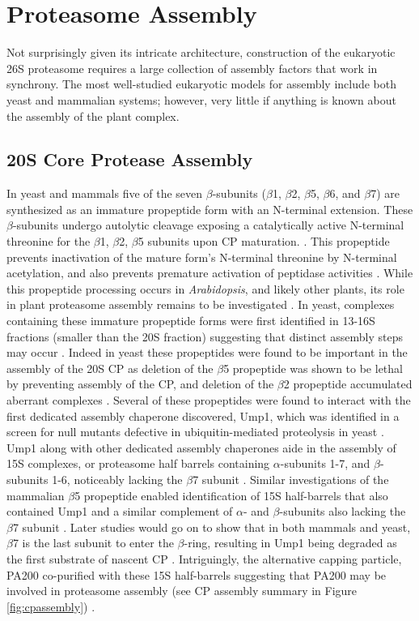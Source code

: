\section{Proteasome Assembly}
	Not surprisingly given its intricate architecture, construction of the eukaryotic 26S proteasome requires a large collection of assembly factors that work in synchrony. The most well-studied eukaryotic models for assembly include both yeast and mammalian systems; however, very little if anything is known about the assembly of the plant complex.

\subsection{20S Core Protease Assembly}
	 In yeast and mammals five of the seven $\beta$-subunits ($\beta$1, $\beta$2, $\beta$5, $\beta$6, and $\beta$7) are synthesized as an immature propeptide form with an N-terminal extension. These $\beta$-subunits undergo autolytic cleavage exposing a catalytically active N-terminal threonine for the $\beta$1, $\beta$2, $\beta$5 subunits upon CP maturation.  \citep{gu14, lee90}. This propeptide prevents inactivation of the mature form's N-terminal threonine by N-terminal acetylation, and also prevents premature activation of peptidase activities \citep{arendt99, arendt97}. While this propeptide processing occurs in \textit{Arabidopsis}, and likely other plants, its role in plant proteasome assembly remains to be investigated \citep{book10}. In yeast, complexes containing these immature propeptide forms were first identified in 13-16S fractions (smaller than the 20S fraction) suggesting that distinct assembly steps may occur \citep{frentzel94}. Indeed in yeast these propeptides were found to be important in the assembly of the 20S CP as deletion of the $\beta$5 propeptide was shown to be lethal by preventing assembly of the CP, and deletion of the $\beta$2 propeptide accumulated aberrant complexes \citep{jager99}. Several of these propeptides were found to interact with the first dedicated assembly chaperone discovered, Ump1, which was identified in a screen for null mutants defective in ubiquitin-mediated proteolysis in yeast \citep{li07, ramos98}. Ump1 along with other dedicated assembly chaperones aide in the assembly of 15S complexes, or proteasome half barrels containing $\alpha$-subunits 1-7, and $\beta$-subunits 1-6, noticeably lacking the $\beta$7 subunit \citep{li07, marques07}. Similar investigations of the mammalian $\beta$5 propeptide enabled identification of 15S half-barrels that also contained Ump1 and a similar complement of $\alpha$- and $\beta$-subunits also lacking the $\beta$7 subunit \citep{witt00}. Later studies would go on to show that in both mammals and yeast, $\beta$7 is the last subunit to enter the $\beta$-ring, resulting in Ump1 being degraded as the first substrate of nascent CP \citep{hirano08, ramos98}. Intriguingly, the alternative capping particle, PA200 co-purified with these 15S half-barrels suggesting that PA200 may be involved in proteasome assembly (see CP assembly summary in Figure \ref{fig:cpassembly}) \citep{li07, marques07}. 

